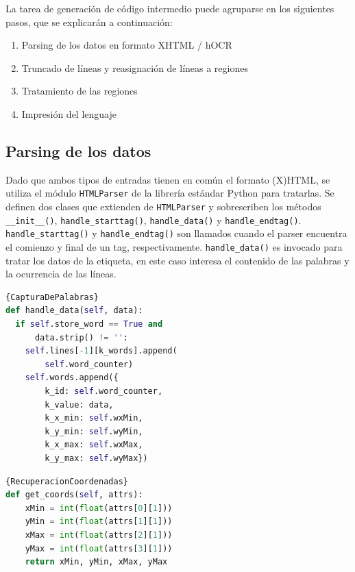 La tarea de generación de código intermedio puede agruparse en los siguientes pasos, que se explicarán a continuación:

\begin{enumerate}
    \item Parsing de los datos en formato XHTML / hOCR
    \item Truncado de líneas y reasignación de líneas a regiones
    \item Tratamiento de las regiones
    \item Impresión del lenguaje
\end{enumerate}    

\subsection{Parsing de los datos}

Dado que ambos tipos de entradas tienen en común el formato (X)HTML, se utiliza el módulo \verb|HTMLParser| de la librería estándar Python para tratarlas. Se definen dos clases que extienden de \verb|HTMLParser| y sobrescriben los métodos \verb|__init__()|, \verb|handle_starttag()|, \verb|handle_data()| y \verb|handle_endtag()|. \verb|handle_starttag()| y \verb|handle_endtag()| son llamados cuando el parser encuentra el comienzo y final de un tag, respectivamente. \verb|handle_data()| es invocado para tratar los datos de la etiqueta, en este caso interesa el contenido de las palabras y la ocurrencia de las líneas.

\noindent\begin{minipage}{.45\textwidth}
    \begin{lstlisting}[language=Python,caption=Captura de las palabras,label={lst:captura-de-palabras}]{CapturaDePalabras}
def handle_data(self, data):
  if self.store_word == True and 
      data.strip() != '':
    self.lines[-1][k_words].append(
        self.word_counter)
    self.words.append({
        k_id: self.word_counter,
        k_value: data,
        k_x_min: self.wxMin,
        k_y_min: self.wyMin,
        k_x_max: self.wxMax,
        k_y_max: self.wyMax})
    \end{lstlisting}
\end{minipage}\hfill
\begin{minipage}{.45\textwidth}
    \begin{lstlisting}[language=Python,caption=Recuperación de coordenadas,label={lst:recuperacion-coordenadas}]{RecuperacionCoordenadas}
def get_coords(self, attrs):
    xMin = int(float(attrs[0][1]))
    yMin = int(float(attrs[1][1]))
    xMax = int(float(attrs[2][1]))
    yMax = int(float(attrs[3][1]))
    return xMin, yMin, xMax, yMax
    \end{lstlisting}
\end{minipage}


